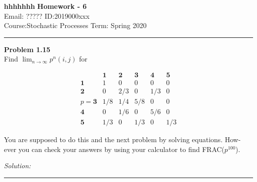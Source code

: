 \documentclass[a4paper, 11pt]{article}
\newenvironment{problem}[2][Problem]
    { \begin{mdframed}[backgroundcolor=gray!20] \textbf{#1 #2} \\}
    {  \end{mdframed}}
\newenvironment{solution}
    {\textit{Solution:}}
    {}
\begin{document}
\noindent
\large\textbf{hhhhhhh} \hfill \textbf{Homework - 6}   \\
Email: ????? \hfill ID:2019000xxx \\
\normalsize Course:Stochastic Processes \hfill Term: Spring 2020\\
\noindent\rule{7in}{2.8pt}
\begin{problem}{1.15}
Find $\lim_{n\rightarrow \infty}p^n(i,j)$ for

 $$
\begin{array}{rrrrrr} & \mathbf{1} & \mathbf{2} & \mathbf{3} & \mathbf{4} & \mathbf{5} \\ \mathbf{1} & 1 & 0 & 0 & 0 & 0 \\ \mathbf{2} & 0 & 2 / 3 & 0 & 1 / 3 & 0 \\ p=\mathbf{3} & 1 / 8 & 1 / 4 & 5 / 8 & 0 & 0 \\ \mathbf{4} & 0 & 1 / 6 & 0 & 5 / 6 & 0 \\ \mathbf{5} & 1 / 3 & 0 & 1 / 3 & 0 & 1 / 3\end{array}
$$

You are supposed to do this and the next problem by solving equations. How-
ever you can check your answers by using your calculator to find FRAC($p^{100}$).

\end{problem}
\begin{solution}

\end{solution} 
\noindent\rule{7in}{2.8pt}

\end{document}

